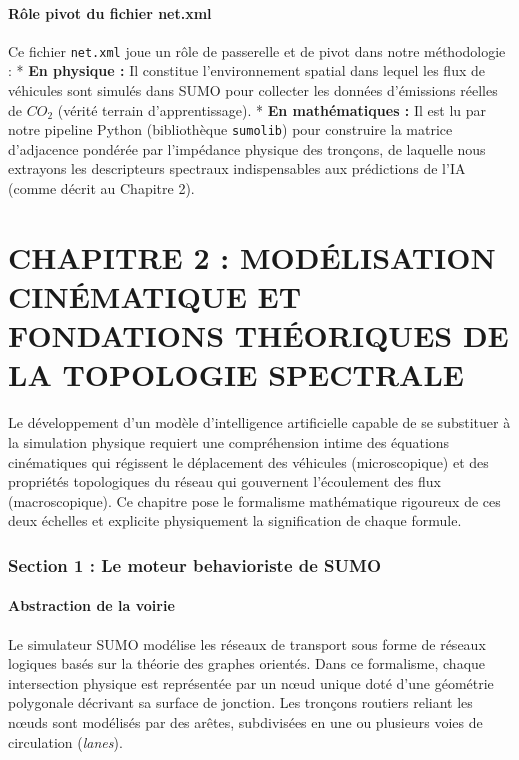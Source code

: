 \documentclass[10pt, a4paper]{article}
\begin{document}
\paragraph{Rôle pivot du fichier
net.xml}\label{ruxf4le-pivot-du-fichier-net.xml}

Ce fichier \texttt{net.xml} joue un rôle de passerelle et de pivot dans
notre méthodologie : * \textbf{En physique :} Il constitue
l'environnement spatial dans lequel les flux de véhicules sont simulés
dans SUMO pour collecter les données d'émissions réelles de \(CO_2\)
(vérité terrain d'apprentissage). * \textbf{En mathématiques :} Il est
lu par notre pipeline Python (bibliothèque \texttt{sumolib}) pour
construire la matrice d'adjacence pondérée par l'impédance physique des
tronçons, de laquelle nous extrayons les descripteurs spectraux
indispensables aux prédictions de l'IA (comme décrit au Chapitre 2).

\newpage

\section{CHAPITRE 2 : MODÉLISATION CINÉMATIQUE ET FONDATIONS THÉORIQUES
DE LA TOPOLOGIE
SPECTRALE}\label{chapitre-2-moduxe9lisation-cinuxe9matique-et-fondations-thuxe9oriques-de-la-topologie-spectrale}

Le développement d'un modèle d'intelligence artificielle capable de se
substituer à la simulation physique requiert une compréhension intime
des équations cinématiques qui régissent le déplacement des véhicules
(microscopique) et des propriétés topologiques du réseau qui gouvernent
l'écoulement des flux (macroscopique). Ce chapitre pose le formalisme
mathématique rigoureux de ces deux échelles et explicite physiquement la
signification de chaque formule.

\subsubsection{Section 1 : Le moteur behavioriste de
SUMO}\label{section-1-le-moteur-behavioriste-de-sumo}

\paragraph{Abstraction de la voirie}\label{abstraction-de-la-voirie}

Le simulateur SUMO modélise les réseaux de transport sous forme de
réseaux logiques basés sur la théorie des graphes orientés. Dans ce
formalisme, chaque intersection physique est représentée par un nœud
unique doté d'une géométrie polygonale décrivant sa surface de jonction.
Les tronçons routiers reliant les nœuds sont modélisés par des arêtes,
subdivisées en une ou plusieurs voies de circulation (\emph{lanes}).
\end{document}
